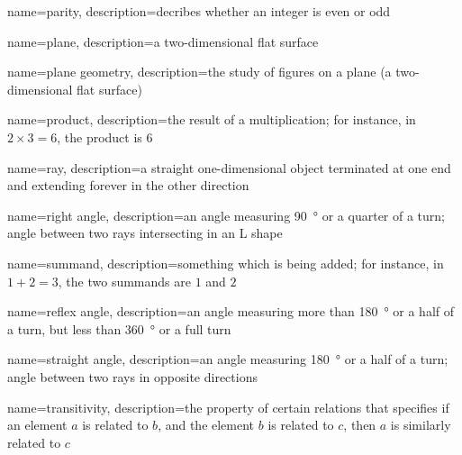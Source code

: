 {
  name=parity,
  description={decribes whether an integer is even or odd}
}

{
  name=plane,
  description={a two-dimensional flat surface}
}

{
  name=plane geometry,
  description={the study of figures on a plane (a two-dimensional flat surface)}
}

{
  name=product,
  description={the result of a multiplication; for instance, in
  $2\times3=6$, the product is $6$}
}

{
  name=ray,
  description={a straight one-dimensional object terminated at one end and
  extending forever in the other direction}
}

{
  name=right angle,
  description={an angle measuring \SI{90}{\degree} or a quarter of a turn; angle
  between two rays intersecting in an L shape}
}

{
  name=summand,
  description={something which is being added; for instance, in $1+2=3$,
  the two summands are $1$ and $2$}
}

{
  name=reflex angle,
  description={an angle measuring more than \SI{180}{\degree} or a half of a
  turn, but less than \SI{360}{\degree} or a full turn}
}

{
  name=straight angle,
  description={an angle measuring \SI{180}{\degree} or a half of a turn; angle
  between two rays in opposite directions}
}

{
  name=transitivity,
  description={the property of certain relations that specifies if an
  element $a$ is related to $b$, and the element $b$ is related to $c$,
  then $a$ is similarly related to $c$}
}
